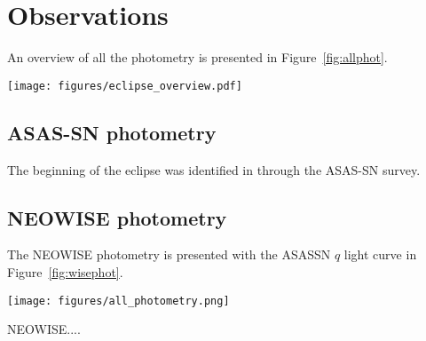 \documentclass{aa}
\begin{document}
\section{Observations}\label{sec:obs}
An overview of all the photometry is presented in Figure~\ref{fig:allphot}.


\begin{figure*}
   \begin{centering}
   \texttt{[image: figures/eclipse\_overview.pdf]}
      \caption{Photometry from the optical bands of the eclipse.
The different telescopes and filters are indicated in the legend.
%
Each light curve is offset vertically by 0.8.
              }
              \label{fig:allphot}
              \end{centering}
       \end{figure*}



\subsection{ASAS-SN photometry}

The beginning of the eclipse was identified in \citet{RizzoSmith21} through the ASAS-SN survey.
%

\subsection{NEOWISE photometry}

The NEOWISE photometry is presented with the ASASSN $q$ light curve in Figure~\ref{fig:wisephot}.

\begin{figure*}
   \begin{centering}
   \texttt{[image: figures/all\_photometry.png]}
      \caption{NEOWISE $W1$ and $W2$ photometry of the star, with the WISE color in the lowest panel.
      The $NEOWISE$ color changes from colourless to very red, which fades back towards colourless over $\sim 500$ days.
              }
              \label{fig:wisephot}
              \end{centering}
       \end{figure*}




NEOWISE....

\end{document}
